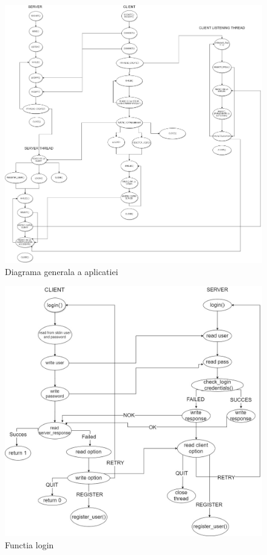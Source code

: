 \documentclass[runningheads]{llncs}
\begin{document}
\begin{figure}[H]
\includegraphics[width=\textwidth]{APPLICATION.jpg}
\caption{Diagrama generala a aplicatiei}
\end{figure}

\begin{figure}[H]
\includegraphics[width=\textwidth]{login.jpg}
\caption{Functia login}
\end{figure}
\end{document}
